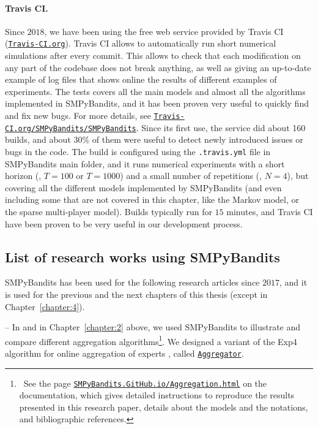 \paragraph{Travis CI.}
Since $2018$, we have been using the free web service provided by Travis CI (\href{https://travis-ci.org/}{\texttt{Travis-CI.org}}).
Travis CI allows to automatically run short numerical simulations after every commit.
This allows to check that each modification on any part of the codebase does not break anything, as well as giving an up-to-date example of log files that shows online the results of different examples of experiments. The tests covers all the main models and almost all the algorithms implemented in SMPyBandits, and it has been proven very useful to quickly find and fix new bugs.
For more details, see \href{https://travis-ci.org/SMPyBandits/SMPyBandits}{\texttt{Travis-CI.org/SMPyBandits/SMPyBandits}}.
%
Since its first use, the service did about 160 builds, and about $30\%$ of them were useful to detect newly introduced issues or bugs in the code.
The build is configured using the \texttt{.travis.yml} file in SMPyBandits main folder, and it runs numerical experiments with a short horizon (\eg, $T=100$ or $T=1000$) and a small number of repetitions (\ie, $N=4$), but covering all the different models implemented by SMPyBandits (and even including some that are not covered in this chapter, like the Markov model, or the sparse multi-player model).
Builds typically run for $15$ minutes, and Travis CI have been proven to be very useful in our development process.



\subsection{List of research works using SMPyBandits}

SMPyBandits has been used for the following research articles since $2017$, and it is used for the previous and the next chapters of this thesis (except in Chapter~\ref{chapter:4}).

-- In \cite{Besson2018WCNC} and in Chapter~\ref{chapter:2} above, we used SMPyBandits to illustrate and compare different aggregation algorithms\footnote{~See the page \texttt{\href{https://SMPyBandits.GitHub.io/Aggregation.html}{SMPyBandits.GitHub.io/Aggregation.html}} on the documentation, which gives detailed instructions to reproduce the results presented in this research paper, details about the models and the notations, and bibliographic references.}. We designed a variant of the Exp4 algorithm for online aggregation of experts \cite{Bubeck12}, called \texttt{\href{https://SMPyBandits.GitHub.io/docs/Policies.Aggregator.html}{Aggregator}}.

